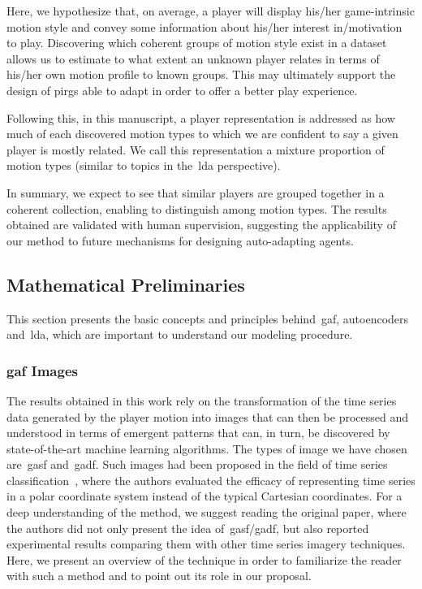 Here, we hypothesize that, on average, a player will display his/her game-intrinsic motion style and convey some information about his/her interest in/motivation to play. Discovering which coherent groups of motion style exist in a dataset allows us to estimate to what extent an unknown player relates in terms of his/her own motion profile to known groups. This may ultimately support the design of \gls{pirg}s able to adapt in order to offer a better play experience.

Following this, in this manuscript, a player representation is addressed as how much of each discovered motion types to which we are confident to say a given player is mostly related. %
We call this representation a {mixture proportion of motion types} (similar to topics in the~\gls{lda} perspective). 

In summary, we expect to see that similar players are grouped together in a coherent collection, enabling to distinguish among motion types. The results obtained are validated with human supervision, suggesting the applicability of our method to future mechanisms for designing auto-adapting agents.

\subsection{Mathematical Preliminaries}
This section presents the basic concepts and principles behind~\gls{gaf}, autoencoders and~\gls{lda}, which are important to understand our modeling procedure. %

\subsubsection{\glsdesc{gaf} Images}

The results obtained in this work rely on the transformation of the time series data generated by the player motion into images that can then be processed and understood in terms of emergent patterns that can, in turn, be discovered by state-of-the-art machine learning algorithms. The types of image we have chosen are~\gls{gasf} and~\gls{gadf}. Such images had been proposed in the field of time series classification~\citep{wang_imaging_2015}, where the authors evaluated the efficacy of representing time series in a polar coordinate system instead of the typical Cartesian coordinates. For a deep understanding of the method, we suggest reading the original paper, where the authors did not only present the idea of~\gls{gasf}/\gls{gadf}, but also reported experimental results comparing them with other time series imagery techniques. Here, we present an overview of the technique in order to familiarize the reader with such a method and to point out its role in our proposal.

